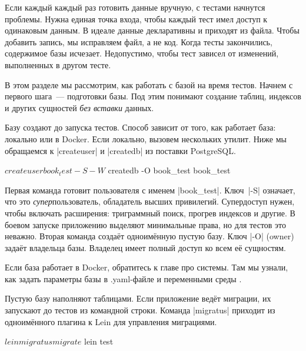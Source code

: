 Если каждый каждый раз готовить данные вручную, с тестами начнутся
проблемы. Нужна единая точка входа, чтобы каждый тест имел доступ к одинаковым
данным. В идеале данные декларативны и приходят из файла. Чтобы добавить запись,
мы исправляем файл, а не код. Когда тесты закончились, содержимое базы
исчезает. Недопустимо, чтобы тест зависел от изменений, выполненных в другом
тесте.

В этом разделе мы рассмотрим, как работать с базой на время тестов. Начнем с
первого шага~--- подготовки базы. Под этим понимают создание таблиц, индексов и
других сущностей \emph{без вставки} данных.


Базу создают до запуска тестов. Способ зависит от того, как работает база:
локально или в Docker. Если локально, вызовем нескольких утилит. Ниже мы
обращаемся к \spverb|createuser| и \spverb|createdb| из поставки PostgreSQL.

\begin{english}
  \begin{bash}
$ createuser book_test -S -W
$ createdb -O book_test book_test
  \end{bash}
\end{english}

Первая команда готовит пользователя с именем \spverb|book_test|.
Ключ~\spverb|-S| означает, что это \emph{супер}пользователь,
обладатель высших привилегий. Супердоступ нужен, чтобы включать расширения:
триграммный поиск, прогрев индексов и другие. В боевом запуске приложению
выделяют минимальные права, но для тестов это неважно. Вторая команда создаёт
одноимённую пустую базу. Ключ \spverb|-O| (owner) задаёт владельца
базы. Владелец имеет полный доступ ко всем её сущностям.


Если база работает в Docker, обратитесь к главе про системы. Там мы узнали, как
задать параметры базы в .yaml-файле и переменными среды .


Пустую базу наполняют таблицами. Если приложение ведёт миграции, их запускают до
тестов из командной строки. Команда \spverb|migratus| приходит из
одноимённого плагина к
Lein для управления миграциями.

\begin{english}
  \begin{clojure}
$ lein migratus migrate
$ lein test
  \end{clojure}
\end{english}

